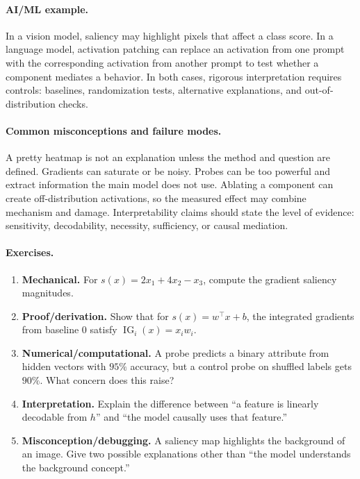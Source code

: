 \paragraph{AI/ML example.}
In a vision model, saliency may highlight pixels that affect a class score. In a language model, activation patching can replace an activation from one prompt with the corresponding activation from another prompt to test whether a component mediates a behavior. In both cases, rigorous interpretation requires controls: baselines, randomization tests, alternative explanations, and out-of-distribution checks.

\paragraph{Common misconceptions and failure modes.}
A pretty heatmap is not an explanation unless the method and question are defined. Gradients can saturate or be noisy. Probes can be too powerful and extract information the main model does not use. Ablating a component can create off-distribution activations, so the measured effect may combine mechanism and damage. Interpretability claims should state the level of evidence: sensitivity, decodability, necessity, sufficiency, or causal mediation.

\paragraph{Exercises.}
\begin{enumerate}[label=\textbf{42.3.\arabic*.}, leftmargin=*]
\item \textbf{Mechanical.} For \(s(x)=2x_1+4x_2-x_3\), compute the gradient saliency magnitudes.
\item \textbf{Proof/derivation.} Show that for \(s(x)=w^\top x+b\), the integrated gradients from baseline \(0\) satisfy \(\operatorname{IG}_i(x)=x_i w_i\).
\item \textbf{Numerical/computational.} A probe predicts a binary attribute from hidden vectors with \(95\%\) accuracy, but a control probe on shuffled labels gets \(90\%\). What concern does this raise?
\item \textbf{Interpretation.} Explain the difference between ``a feature is linearly decodable from \(h\)'' and ``the model causally uses that feature.''
\item \textbf{Misconception/debugging.} A saliency map highlights the background of an image. Give two possible explanations other than ``the model understands the background concept.''
\end{enumerate}

